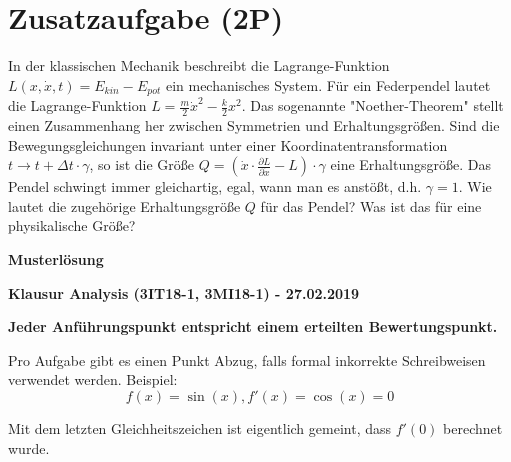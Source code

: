 \documentclass[12pt]{article}
\begin{document}
\newpage
\section*{Zusatzaufgabe (2P)}


In der klassischen Mechanik beschreibt die Lagrange-Funktion $L(x,\dot x, t) = E_{kin} - E_{pot}$ ein mechanisches System. Für ein Federpendel lautet die Lagrange-Funktion $L=\frac{m}{2}\dot{x}^2 - \frac{k}{2}x^2$. Das sogenannte "Noether-Theorem" stellt einen Zusammenhang her zwischen Symmetrien und Erhaltungsgrößen. Sind die Bewegungsgleichungen invariant unter einer Koordinatentransformation $t \to t+\Delta t\cdot\gamma$, so ist die Größe $Q=\left(\dot x \cdot \frac{\partial L}{\partial \dot x} - L\right)\cdot\gamma$ eine Erhaltungsgröße. Das Pendel schwingt immer gleichartig, egal, wann man es anstößt, d.h. $\gamma = 1$. Wie lautet die zugehörige Erhaltungsgröße $Q$ für das Pendel? Was ist das für eine physikalische Größe?

\newpage

\begin{center}
{\bf {\large Musterlösung}}
\end{center}

\begin{center}
{\bf {\large Klausur Analysis (3IT18-1, 3MI18-1) - 27.02.2019}}
\end{center}

\begin{center}
\textbf{Jeder Anführungspunkt entspricht einem erteilten Bewertungspunkt.}
\end{center}

Pro Aufgabe gibt es einen Punkt Abzug, falls formal inkorrekte Schreibweisen verwendet werden. Beispiel: 
$$f(x)=\sin(x), f'(x)=\cos(x)=0$$

Mit dem letzten Gleichheitszeichen ist eigentlich gemeint, dass $f'(0)$  berechnet wurde.
\end{document}
